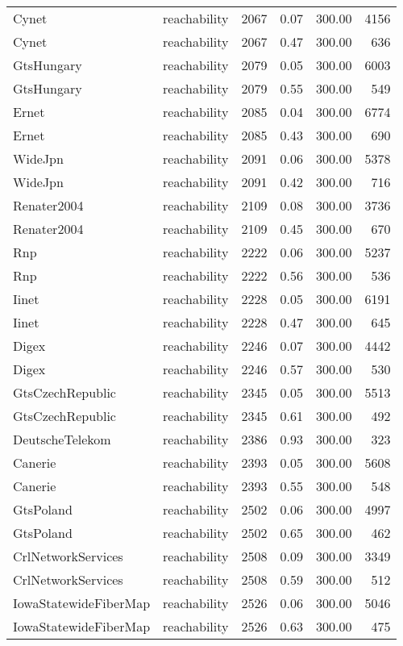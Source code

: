 \begin{tabular}{llrrrr}
Cynet & reachability & 2067 & 0.07 & 300.00 & 4156 \\
Cynet & reachability & 2067 & 0.47 & 300.00 & 636 \\
GtsHungary & reachability & 2079 & 0.05 & 300.00 & 6003 \\
GtsHungary & reachability & 2079 & 0.55 & 300.00 & 549 \\
Ernet & reachability & 2085 & 0.04 & 300.00 & 6774 \\
Ernet & reachability & 2085 & 0.43 & 300.00 & 690 \\
WideJpn & reachability & 2091 & 0.06 & 300.00 & 5378 \\
WideJpn & reachability & 2091 & 0.42 & 300.00 & 716 \\
Renater2004 & reachability & 2109 & 0.08 & 300.00 & 3736 \\
Renater2004 & reachability & 2109 & 0.45 & 300.00 & 670 \\
Rnp & reachability & 2222 & 0.06 & 300.00 & 5237 \\
Rnp & reachability & 2222 & 0.56 & 300.00 & 536 \\
Iinet & reachability & 2228 & 0.05 & 300.00 & 6191 \\
Iinet & reachability & 2228 & 0.47 & 300.00 & 645 \\
Digex & reachability & 2246 & 0.07 & 300.00 & 4442 \\
Digex & reachability & 2246 & 0.57 & 300.00 & 530 \\
GtsCzechRepublic & reachability & 2345 & 0.05 & 300.00 & 5513 \\
GtsCzechRepublic & reachability & 2345 & 0.61 & 300.00 & 492 \\
DeutscheTelekom & reachability & 2386 & 0.93 & 300.00 & 323 \\
Canerie & reachability & 2393 & 0.05 & 300.00 & 5608 \\
Canerie & reachability & 2393 & 0.55 & 300.00 & 548 \\
GtsPoland & reachability & 2502 & 0.06 & 300.00 & 4997 \\
GtsPoland & reachability & 2502 & 0.65 & 300.00 & 462 \\
CrlNetworkServices & reachability & 2508 & 0.09 & 300.00 & 3349 \\
CrlNetworkServices & reachability & 2508 & 0.59 & 300.00 & 512 \\
IowaStatewideFiberMap & reachability & 2526 & 0.06 & 300.00 & 5046 \\
IowaStatewideFiberMap & reachability & 2526 & 0.63 & 300.00 & 475 \\

\end{tabular}
